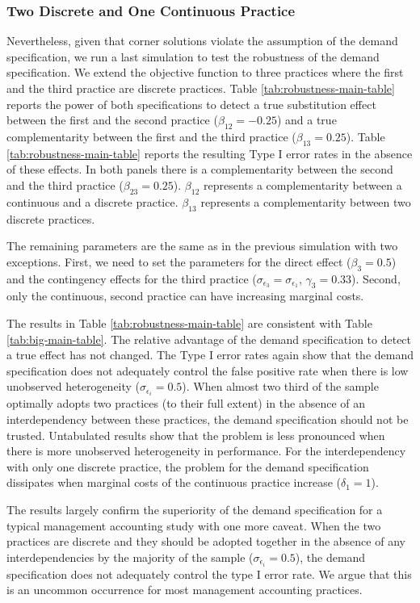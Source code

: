 \documentclass[12pt]{article}
\begin{document}
\subsubsection{Two Discrete and One Continuous Practice}

Nevertheless, given that corner solutions violate the assumption of the demand specification, we run a last simulation to test the robustness of the demand specification. We extend the objective function to three practices where the first and the third practice are discrete practices. Table \ref{tab:robustness-main-table} reports the power of both specifications to detect a true substitution effect between the first and the second practice ($\beta_{12} = -0.25$) and a true complementarity between the first and the third practice ($\beta_{13} = 0.25$). Table \ref{tab:robustness-main-table} reports the resulting Type I error rates in the absence of these effects. In both panels there is a complementarity between the second and the third practice ($\beta_{23} = 0.25$). $\beta_{12}$ represents a complementarity between a continuous and a discrete practice. $\beta_{13}$ represents a complementarity between two discrete practices.

The remaining parameters are the same as in the previous simulation with two exceptions. First, we need to set the parameters for the direct effect ($\beta_3 = 0.5$) and the contingency effects for the third practice ($\sigma_{\epsilon_3} = \sigma_{\epsilon_1}$, $\gamma_3 = 0.33$). Second, only the continuous, second practice can have increasing marginal costs. 

The results in Table \ref{tab:robustness-main-table} are consistent with Table \ref{tab:big-main-table}. The relative advantage of the demand specification to detect a true effect has not changed. The Type I error rates again show that the demand specification does not adequately control the false positive rate when there is low unobserved heterogeneity ($\sigma_{\epsilon_i} = 0.5$). When almost two third of the sample optimally adopts two practices (to their full extent) in the absence of an interdependency between these practices, the demand specification should not be trusted. Untabulated results show that the problem is less pronounced when there is more unobserved heterogeneity in performance. For the interdependency with only one discrete practice, the problem for the demand specification dissipates when marginal costs of the continuous practice increase ($\delta_1 = 1$). 

The results largely confirm the superiority of the demand specification for a typical management accounting study with one more caveat. When the two practices are discrete and they should be adopted together in the absence of any interdependencies by the majority of the sample ($\sigma_{\epsilon_i} = 0.5$), the demand specification does not adequately control the type I error rate. We argue that this is an uncommon occurrence for most management accounting practices.
\end{document}
